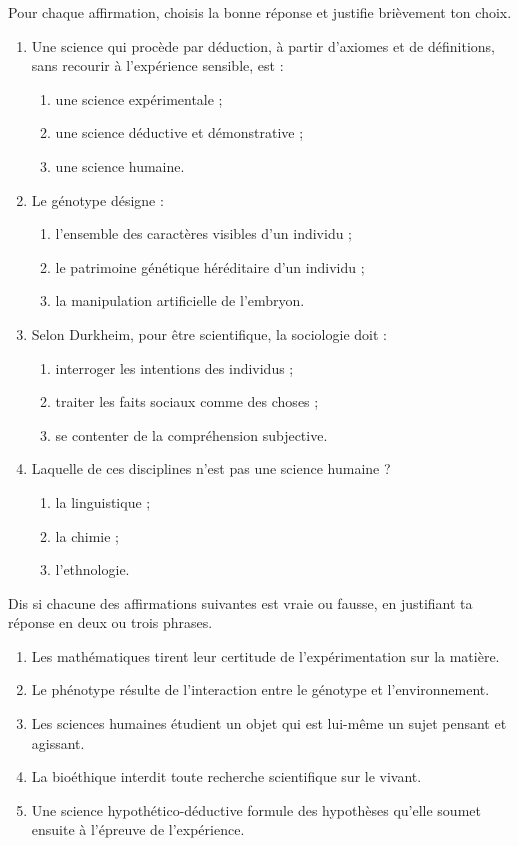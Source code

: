 \documentclass[11pt]{article}
\begin{document}
\begin{exercice}
Pour chaque affirmation, choisis la bonne réponse et justifie brièvement ton choix.
\begin{enumerate}
\item Une science qui procède par déduction, à partir d'axiomes et de définitions, sans recourir à l'expérience sensible, est :
\begin{enumerate}
\item une science expérimentale ;
\item une science déductive et démonstrative ;
\item une science humaine.
\end{enumerate}
\item Le génotype désigne :
\begin{enumerate}
\item l'ensemble des caractères visibles d'un individu ;
\item le patrimoine génétique héréditaire d'un individu ;
\item la manipulation artificielle de l'embryon.
\end{enumerate}
\item Selon Durkheim, pour être scientifique, la sociologie doit :
\begin{enumerate}
\item interroger les intentions des individus ;
\item traiter les faits sociaux comme des choses ;
\item se contenter de la compréhension subjective.
\end{enumerate}
\item Laquelle de ces disciplines n'est pas une science humaine ?
\begin{enumerate}
\item la linguistique ;
\item la chimie ;
\item l'ethnologie.
\end{enumerate}
\end{enumerate}
\end{exercice}

\begin{exercice}
Dis si chacune des affirmations suivantes est vraie ou fausse, en justifiant ta réponse en deux ou trois phrases.
\begin{enumerate}
\item Les mathématiques tirent leur certitude de l'expérimentation sur la matière.
\item Le phénotype résulte de l'interaction entre le génotype et l'environnement.
\item Les sciences humaines étudient un objet qui est lui-même un sujet pensant et agissant.
\item La bioéthique interdit toute recherche scientifique sur le vivant.
\item Une science hypothético-déductive formule des hypothèses qu'elle soumet ensuite à l'épreuve de l'expérience.
\end{enumerate}
\end{exercice}
\end{document}

